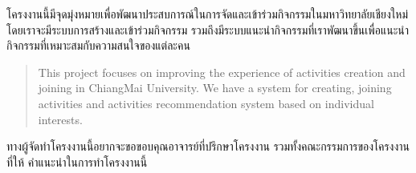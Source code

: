 \maketitle
\makesignature

\ifproject
\begin{abstractTH}
โครงงานนี้มีจุดมุ่งหมายเพื่อพัฒนาประสบการณ์ในการจัดและเข้าร่วมกิจกรรมในมหาวิทยาลัยเชียงใหม่โดยเราจะมีระบบการสร้างและเข้าร่วมกิจกรรม 
\enskip รวมถึงมีระบบแนะนำกิจกรรมที่เราพัฒนาขึ้นเพื่อแนะนำกิจกรรมที่เหมาะสมกับความสนใจของแต่ละคน

\end{abstractTH}

\begin{abstract}
This project focuses on improving the experience of activities creation and joining in ChiangMai University.
\enskip We have a system for creating, joining activities and activities recommendation system based on individual interests.

\end{abstract}

\iffalse
\begin{dedication}
This document is dedicated to all Chiang Mai University students.

Dedication page is optional.
\end{dedication}
\fi %

\begin{acknowledgments}
ทางผู้จัดทำโครงงานนี้อยากจะขอขอบคุณอาจารย์ที่ปรึกษาโครงงาน รวมทั้งคณะกรรมการของโครงงานที่ให้
คำแนะนำในการทำโครงงานนี้

\end{acknowledgments}%
\fi %

\contentspage

\ifproject
\figurelistpage

\tablelistpage
\fi %



